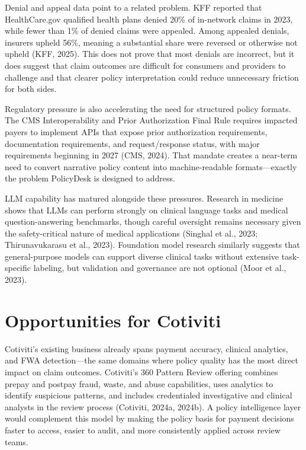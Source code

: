\documentclass[11pt]{article}
\begin{document}
Denial and appeal data point to a related problem. KFF reported that HealthCare.gov qualified health plans denied 20\% of in-network claims in 2023, while fewer than 1\% of denied claims were appealed. Among appealed denials, insurers upheld 56\%, meaning a substantial share were reversed or otherwise not upheld (KFF, 2025). This does not prove that most denials are incorrect, but it does suggest that claim outcomes are difficult for consumers and providers to challenge and that clearer policy interpretation could reduce unnecessary friction for both sides.

Regulatory pressure is also accelerating the need for structured policy formats. The CMS Interoperability and Prior Authorization Final Rule requires impacted payers to implement APIs that expose prior authorization requirements, documentation requirements, and request/response status, with major requirements beginning in 2027 (CMS, 2024). That mandate creates a near-term need to convert narrative policy content into machine-readable formats---exactly the problem PolicyDesk is designed to address.

LLM capability has matured alongside these pressures. Research in medicine shows that LLMs can perform strongly on clinical language tasks and medical question-answering benchmarks, though careful oversight remains necessary given the safety-critical nature of medical applications (Singhal et al., 2023; Thirunavukarasu et al., 2023). Foundation model research similarly suggests that general-purpose models can support diverse clinical tasks without extensive task-specific labeling, but validation and governance are not optional (Moor et al., 2023).

\section*{Opportunities for Cotiviti}
Cotiviti's existing business already spans payment accuracy, clinical analytics, and FWA detection---the same domains where policy quality has the most direct impact on claim outcomes. Cotiviti's 360 Pattern Review offering combines prepay and postpay fraud, waste, and abuse capabilities, uses analytics to identify suspicious patterns, and includes credentialed investigative and clinical analysts in the review process (Cotiviti, 2024a, 2024b). A policy intelligence layer would complement this model by making the policy basis for payment decisions faster to access, easier to audit, and more consistently applied across review teams.
\end{document}
